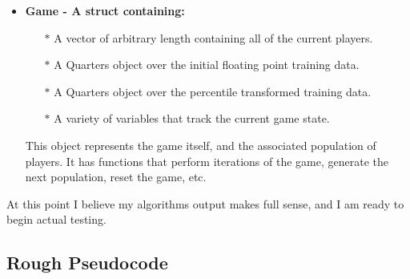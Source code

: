 \begin{itemize}
    \item \bf Game \rm - A struct containing:
    \begin{itemize}
        \item[$\ast$] A vector of arbitrary length containing all of the current players.
        \item[$\ast$] A Quarters object over the initial floating point training data.
        \item[$\ast$] A Quarters object over the percentile transformed training data.
        \item[$\ast$] A variety of variables that track the current game state.
    \end{itemize}
        This object represents the game itself, and the associated population of players. It has functions that perform iterations of the game, generate the next population, reset the game, etc.
\end{itemize}

At this point I believe my algorithms output makes full sense, and I am ready to begin actual testing.

\subsection{Rough Pseudocode}

